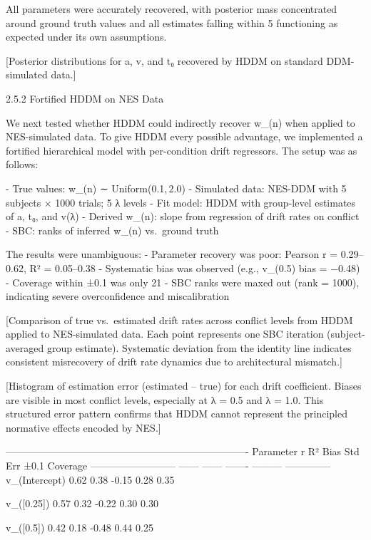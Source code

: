 All parameters were accurately recovered, with posterior mass
concentrated around ground truth values and all estimates falling within
5%
functioning as expected under its own assumptions.

[Posterior distributions for a, v, and t₀ recovered by HDDM on standard
DDM-simulated data.]

2.5.2 Fortified HDDM on NES Data

We next tested whether HDDM could indirectly recover w_(n) when applied
to NES-simulated data. To give HDDM every possible advantage, we
implemented a fortified hierarchical model with per-condition drift
regressors. The setup was as follows:

- True values: w_(n) ∼ Uniform(0.1, 2.0)
- Simulated data: NES-DDM with 5 subjects × 1000 trials; 5 λ levels
- Fit model: HDDM with group-level estimates of a, t₀, and v(λ)
- Derived w_(n): slope from regression of drift rates on conflict
- SBC: ranks of inferred w_(n) vs. ground truth

The results were unambiguous: - Parameter recovery was poor: Pearson
r = 0.29–0.62, R² = 0.05–0.38
- Systematic bias was observed (e.g., v_(0.5) bias = −0.48)
- Coverage within ±0.1 was only 21%
- SBC ranks were maxed out (rank = 1000), indicating severe
overconfidence and miscalibration

[Comparison of true vs. estimated drift rates across conflict levels
from HDDM applied to NES-simulated data. Each point represents one SBC
iteration (subject-averaged group estimate). Systematic deviation from
the identity line indicates consistent misrecovery of drift rate
dynamics due to architectural mismatch.]

[Histogram of estimation error (estimated – true) for each drift
coefficient. Biases are visible in most conflict levels, especially at λ
= 0.5 and λ = 1.0. This structured error pattern confirms that HDDM
cannot represent the principled normative effects encoded by NES.]

  -------------------------------------------------------------------------
  Parameter                  r      R²     Bias    Std Err   ±0.1 Coverage
  -------------------------- ------ ------ ------- --------- --------------
  v_(Intercept)              0.62   0.38   -0.15   0.28      0.35

  v_([0.25])                 0.57   0.32   -0.22   0.30      0.30

  v_([0.5])                  0.42   0.18   -0.48   0.44      0.25

